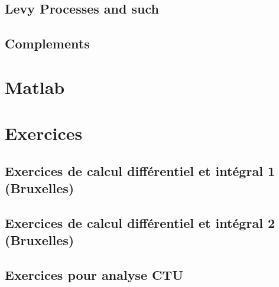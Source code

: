 \chapter{Levy Processes and such}


\chapter{Complements}









\part{Matlab}




\part{Exercices} 





\chapter{Exercices de calcul différentiel et intégral 1 (Bruxelles)}


 
\chapter{Exercices de calcul différentiel et intégral 2 (Bruxelles)}




\chapter{Exercices pour analyse CTU}




 


